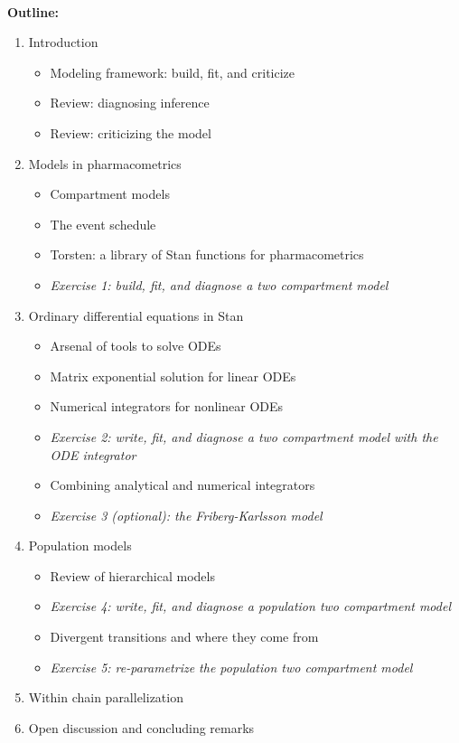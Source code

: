 \documentclass[12pt]{article}
\begin{document}
\ \\
\textbf{Outline:} \\
%
  \begin{enumerate}
   \item Introduction
   \begin{itemize}
     \item Modeling framework: build, fit, and criticize
     \item Review: diagnosing inference
     \item Review: criticizing the model
   \end{itemize}
   \item Models in pharmacometrics
     \begin{itemize}
       \item Compartment models
       \item The event schedule
       \item Torsten: a library of Stan functions for pharmacometrics
       \item \textit{Exercise 1: build, fit, and diagnose a two compartment model}
     \end{itemize}
   \item Ordinary differential equations in Stan
   \begin{itemize}
     \item Arsenal of tools to solve ODEs
     \item Matrix exponential solution for linear ODEs
     \item Numerical integrators for nonlinear ODEs
     \item \textit{Exercise 2: write, fit, and diagnose a two compartment 
     model with the ODE integrator}
     \item Combining analytical and numerical integrators
     \item \textit{Exercise 3 (optional): the Friberg-Karlsson model}
   \end{itemize}
   \item Population models
   \begin{itemize}
     \item Review of hierarchical models
     \item \textit{Exercise 4: write, fit, and diagnose a population two compartment model}
     \item Divergent transitions and where they come from
     \item \textit{Exercise 5: re-parametrize the population two compartment model}
   \end{itemize}
   \item Within chain parallelization
   \item Open discussion and concluding remarks
 
 \end{enumerate}
\end{document}
